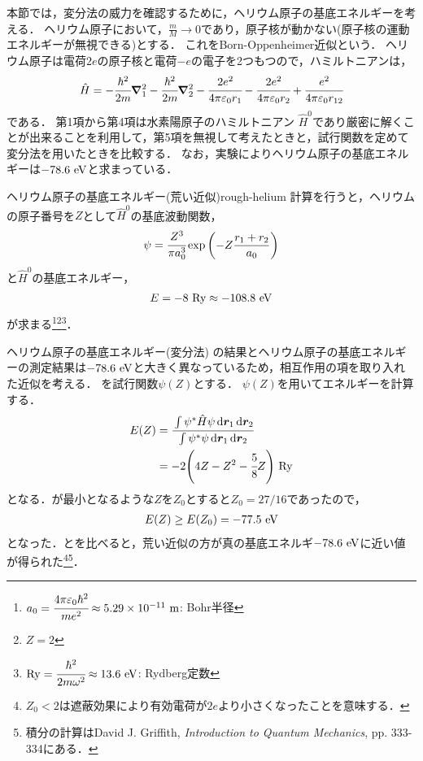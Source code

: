 \documentclass{report}
\begin{document}
  本節では，変分法の威力を確認するために，ヘリウム原子の基底エネルギーを考える．
  ヘリウム原子において，$\frac{m}{M}\to 0$であり，原子核が動かない(原子核の運動エネルギーが無視できる)とする．
  これをBorn-Oppenheimer近似という．
  ヘリウム原子は電荷$2e$の原子核と電荷$-e$の電子を2つもつので，ハミルトニアンは，
    \begin{align}
      \hat{H} = -\cfrac{\hbar^2}{2m}\grad_{1}^{2} -\cfrac{\hbar^2}{2m}\grad_{2}^{2} - \cfrac{2e^2}{4\pi \varepsilon_0 r_1} - \cfrac{2e^2}{4\pi \varepsilon_0 r_2} + \cfrac{e^2}{4\pi \varepsilon_0 r_{12}}
    \end{align}
    である．
    第1項から第4項は水素陽原子のハミルトニアン $\hat{H}^0$であり厳密に解くことが出来ることを利用して，第5項を無視して考えたときと，試行関数を定めて変分法を用いたときを比較する．
    なお，実験によりヘリウム原子の基底エネルギーは$-78.6\ \r{eV}$と求まっている．
  \begin{myex}{ヘリウム原子の基底エネルギー(荒い近似)}{rough-helium}
    計算を行うと，ヘリウムの原子番号を$Z$として$\hat{H}^0$の基底波動関数，
    \begin{align}
      \psi = \cfrac{Z^3}{\pi a_0^3}\exp\qty(-Z\frac{r_1 + r_2}{a_0})\label{helium}
    \end{align}
    と$\hat{H}^0$の基底エネルギー，
    \begin{align}
      E = -8\ \mathrm{Ry}\approx -108.8\ \mathrm{eV}\label{helium-rough-min}
    \end{align}
    が求まる\footnote{
      $a_0 = \cfrac{4\pi\epsilon_0\hbar^2}{me^2} \approx 5.29\times 10^{-11}\ \r{m}$: Bohr半径
    }\footnote{
      $Z = 2$
    }\footnote{
      $\mathrm{Ry} = \cfrac{\hbar^2}{2m\omega^2} \approx 13.6 \ \mathrm{eV}$: Rydberg定数
    }．
  \end{myex}
  \begin{myex}{ヘリウム原子の基底エネルギー(変分法)}{}
    の結果とヘリウム原子の基底エネルギーの測定結果は$-78.6\ \r{eV}$と大きく異なっているため，相互作用の項を取り入れた近似を考える．
    を試行関数$\psi(Z)$とする．
    $\psi(Z)$を用いてエネルギーを計算する．
    \begin{align}
      E(Z) &= \cfrac{\int\psi^{*}\hat{H}\psi \dd{\bm{r}_1}\dd{\bm{r}_2}}{\int\psi^{*}\psi \dd{\bm{r}_1}\dd{\bm{r}_2}} \\
      &= -2\qty(4Z - Z^2 - \cfrac{5}{8}Z)\ \r{Ry}\label{helium-energy-function} 
    \end{align}
    となる．が最小となるような$Z$を$Z_0$とすると$Z_0 = 27/16$であったので，
    \begin{align}
      E(Z) \geq E\qty(Z_0) = -77.5\ \r{eV}\label{helium-energy-varidation-min}
    \end{align}
    となった．とを比べると，荒い近似の方が真の基底エネルギ$-78.6\ \r{eV}$に近い値が得られた\footnote{
      $Z_0 < 2$は遮蔽効果により有効電荷が$2e$より小さくなったことを意味する．
    }\footnote{
      積分の計算はDavid J. Griffith, \textit{Introduction to Quantum Mechanics}, pp. 333-334にある．
    }．
  \end{myex}
\end{document}

